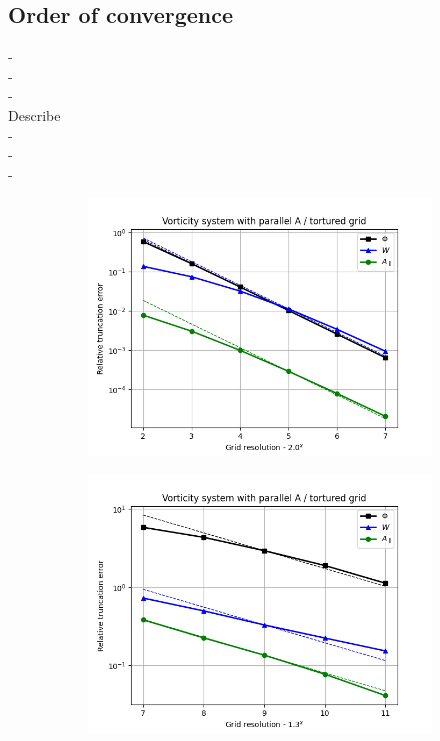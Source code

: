 \subsection{Order of convergence}
- \\
- \\
- \\
Describe \\
- \\
- \\
- \\
\begin{figure}[H]
	\centering
	\begin{subfigure}[b]{0.49\textwidth}
		\centering
		\includegraphics[width=1\textwidth]{schemes/err_rel_vortAParaSystem_grid2_2D.png}
		\label{fig:MMSTorturedVortAPara2DConvergence}
	\end{subfigure}
	\begin{subfigure}[b]{0.49\textwidth}
		\centering
		\includegraphics[width=1\textwidth]{schemes/err_rel_vortAParaSystem_grid2_3D.png}

\end{subfigure}
\end{figure}

